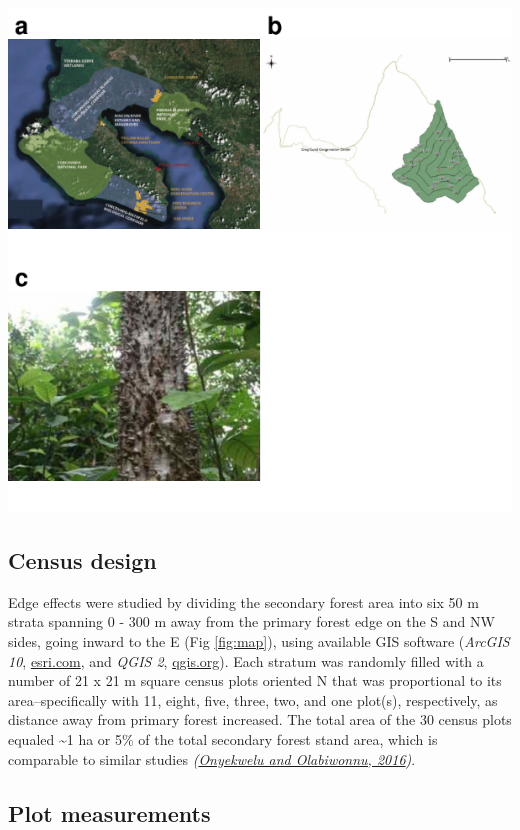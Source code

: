 \documentclass[
  12pt,
]{article}
\begin{document}
\includegraphics{merge_files/figure-latex/map-1.pdf}

\hypertarget{census-design}{%
\subsection{Census design}\label{census-design}}

Edge effects were studied by dividing the secondary forest area into six 50 m strata spanning 0 - 300 m away from the primary forest edge on the S and NW sides, going inward to the E (Fig \ref{fig:map}), using available GIS software (\emph{ArcGIS 10}, \url{esri.com}, and \emph{QGIS 2}, \url{qgis.org}).
Each stratum was randomly filled with a number of 21 x 21 m square census plots oriented N that was proportional to its area--specifically with 11, eight, five, three, two, and one plot(s), respectively, as distance away from primary forest increased.
The total area of the 30 census plots equaled \textasciitilde1 ha or 5\% of the total secondary forest stand area, which is comparable to similar studies \emph{(\protect\hyperlink{ref-onyekwelu16}{Onyekwelu and Olabiwonnu, 2016})}.

\hypertarget{plot-measurements}{%
\subsection{Plot measurements}\label{plot-measurements}}
\end{document}
